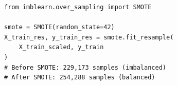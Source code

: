 \documentclass[12pt,a4paper]{article}
\begin{document}
\begin{lstlisting}[caption={Application of SMOTE on the training set}]
from imblearn.over_sampling import SMOTE

smote = SMOTE(random_state=42)
X_train_res, y_train_res = smote.fit_resample(
    X_train_scaled, y_train
)
# Before SMOTE: 229,173 samples (imbalanced)
# After SMOTE: 254,288 samples (balanced)
\end{lstlisting}


\end{document}

